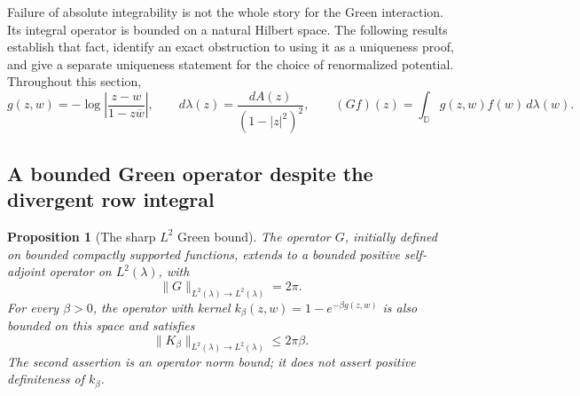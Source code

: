 \documentclass[11pt,a4paper]{article}
\numberwithin{equation}{section}
\newtheorem{proposition}[theorem]{Proposition}
\theoremstyle{definition}
\theoremstyle{remark}
\begin{document}
Failure of absolute integrability is not the whole story for the Green
interaction.  Its integral operator is bounded on a natural Hilbert
space.  The following results establish that fact, identify an exact
obstruction to using it as a uniqueness proof, and give a separate
uniqueness statement for the choice of renormalized potential.
Throughout this section,
\[
 g(z,w)=-\log\left|\frac{z-w}{1-z\overline w}\right|,
 \qquad d\lambda(z)=\frac{dA(z)}{(1-|z|^2)^2},
 \qquad (Gf)(z)=\int_{\mathbb D}g(z,w)f(w)\,d\lambda(w).
\]

\subsection{A bounded Green operator despite the divergent row integral}

\begin{proposition}[The sharp $L^2$ Green bound]
\label{prop:hyperbolic-green-operator-bound}
The operator $G$, initially defined on bounded compactly supported
functions, extends to a bounded positive self-adjoint operator on
$L^2(\lambda)$, with
\begin{equation}
 \|G\|_{L^2(\lambda)\to L^2(\lambda)}=2\pi.
 \label{eq:hyperbolic-green-sharp-norm}
\end{equation}
For every $\beta>0$, the operator with kernel
$k_\beta(z,w)=1-e^{-\beta g(z,w)}$ is also bounded on this space and
satisfies
\begin{equation}
 \|K_\beta\|_{L^2(\lambda)\to L^2(\lambda)}\le2\pi\beta.
 \label{eq:hyperbolic-mayer-operator-bound}
\end{equation}
The second assertion is an operator norm bound; it does not assert
positive definiteness of $k_\beta$.
\end{proposition}
\end{document}
